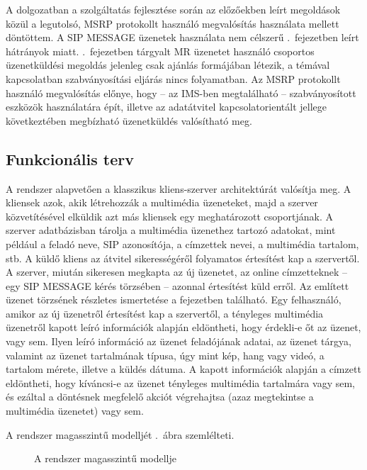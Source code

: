 \medskip

A dolgozatban a szolgáltatás fejlesztése során az előzőekben leírt megoldások közül a legutolsó, MSRP protokollt használó megvalósítás használata mellett döntöttem. A SIP MESSAGE üzenetek használata nem célszerű .~fejezetben leírt hátrányok miatt. .~fejezetben tárgyalt MR üzenetet használó csoportos üzenetküldési megoldás jelenleg csak ajánlás formájában létezik, a témával kapcsolatban szabványosítási eljárás nincs folyamatban. Az MSRP protokollt használó megvalósítás előnye, hogy -- az IMS-ben megtalálható -- szabványosított eszközök használatára épít, illetve az adatátvitel kapcsolatorientált jellege következtében megbízható üzenetküldés valósítható meg. 

\subsection{Funkcionális terv}

A rendszer alapvetően a klasszikus kliens-szerver architektúrát valósítja meg. A kliensek azok, akik létrehozzák a multimédia üzeneteket, majd a szerver közvetítésével elküldik azt más kliensek egy meghatározott csoportjának. A szerver adatbázisban tárolja a multimédia üzenethez tartozó adatokat, mint például a feladó neve, SIP azonosítója, a címzettek nevei, a multimédia tartalom, stb. A küldő kliens az átvitel sikerességéről folyamatos értesítést kap a szervertől. A szerver, miután sikeresen megkapta az új üzenetet, az online címzetteknek -- egy SIP MESSAGE kérés törzsében -- azonnal értesítést küld erről. Az említett üzenet törzsének részletes ismertetése a  fejezetben található. Egy felhasználó, amikor az új üzenetről értesítést kap a szervertől, a tényleges multimédia üzenetről kapott leíró információk alapján eldöntheti, hogy érdekli-e őt az üzenet, vagy sem. Ilyen leíró információ az üzenet feladójának adatai, az üzenet tárgya, valamint az üzenet tartalmának típusa, úgy mint kép, hang vagy videó, a tartalom mérete, illetve a küldés dátuma. A kapott információk alapján a címzett eldöntheti, hogy kíváncsi-e az üzenet tényleges multimédia tartalmára vagy sem, és ezáltal a döntésnek megfelelő akciót végrehajtsa (azaz megtekintse a multimédia üzenetet) vagy sem. 

A rendszer magasszintű modelljét .~ábra szemlélteti.

\begin{figure}[htbp]
\center
{}
\caption{A rendszer magasszintű modellje}
\label{fig:model}
\end{figure}


